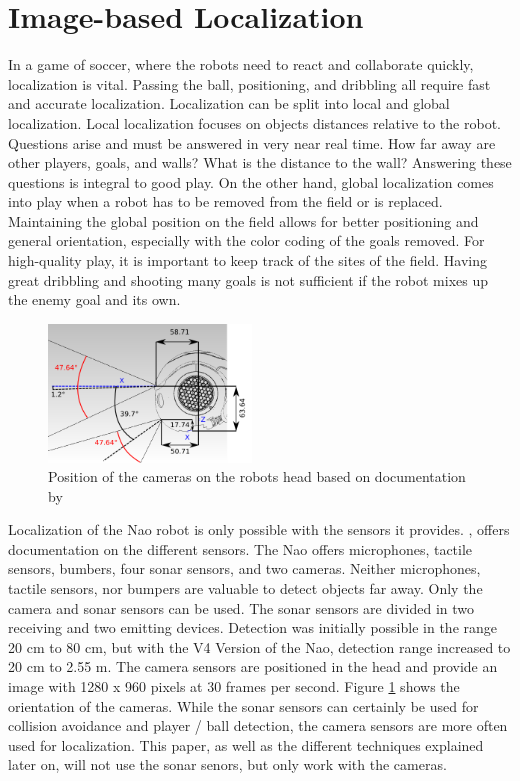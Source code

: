 \documentclass[12pt, a4paper, doc]{apa6}
\begin{document}
  \section{Image-based Localization}
  In a game of soccer, where the robots need to react and collaborate quickly, localization is vital. Passing the ball, positioning, and dribbling all require fast and accurate localization. Localization can be split into local and global localization. Local localization focuses on objects distances relative to the robot. Questions arise and must be answered in very near real time. How far away are other players, goals, and walls? What is the distance to the wall? Answering these questions is integral to good play. On the other hand, global localization comes into play when a robot has to be removed from the field or is replaced. Maintaining the global position on the field allows for better positioning and general orientation, especially with the color coding of the goals removed. For high-quality play, it is important to keep track of the sites of the field. Having great dribbling and shooting many goals is not sufficient if the robot mixes up the enemy goal and its own.

  \begin{figure}
    \begin{center}
      \includegraphics[width=0.48\textwidth]{eyes.png}
    \end{center}
    \caption{Position of the cameras on the robots head based on documentation by \cite{naosheet}}
    \label{eyes}
  \end{figure}

  Localization of the Nao robot is only possible with the sensors it provides. \cite{naosheet}, offers documentation on the different sensors. The Nao offers microphones, tactile sensors, bumbers, four sonar sensors, and two cameras. Neither microphones, tactile sensors, nor bumpers are valuable to detect objects far away. Only the camera and sonar sensors can be used. The sonar sensors are divided in two receiving and two emitting devices. Detection was initially possible in the range 20 cm to 80 cm, but with the V4 Version of the Nao, detection range increased to 20 cm to 2.55 m. The camera sensors are positioned in the head and provide an image with 1280 x 960 pixels at 30 frames per second. Figure \ref{eyes} shows the orientation of the cameras. While the sonar sensors can certainly be used for collision avoidance and player / ball detection, the camera sensors are more often used for localization. This paper, as well as the different techniques explained later on, will not use the sonar senors, but only work with the cameras.
\end{document}
